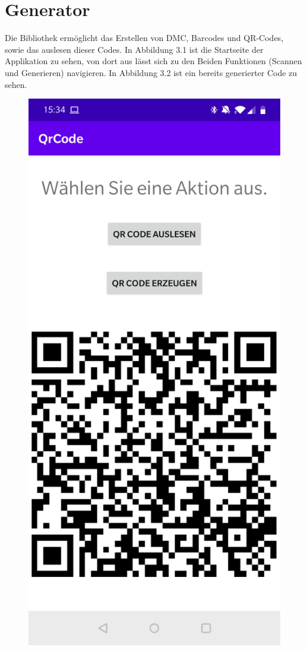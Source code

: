 \documentclass[12pt,					%
							 oneside,			%
							 a4paper,			%
							 halfparskip,		%
							 liststotoc,			%
							 bibtotoc,			%
							 fleqn,				%
							 pointlessnumbers]	%
							 {scrreprt}
\begin{document}
\section{Generator}
Die Bibliothek ermöglicht das Erstellen von DMC, Barcodes und QR-Codes, sowie das auslesen dieser Codes. In Abbildung 3.1 ist die Startseite der Applikation zu sehen, von dort aus lässt sich zu den Beiden Funktionen (Scannen und Generieren) navigieren. In Abbildung 3.2 ist ein bereits generierter Code zu sehen. 
\begin{figure}[ht]
\centering
   \begin{minipage}[b]{.4\linewidth} %
	\centering
	 \includegraphics[scale=0.1]{pictures/MAIN} 

\end{minipage}
\end{figure}
\end{document}
